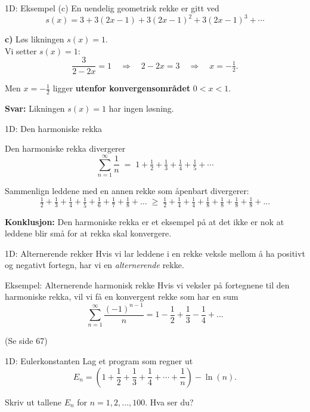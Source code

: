 \greenheader
\begin{frame}{1D: Eksempel (c)}
En uendelig geometrisk rekke er gitt ved
\[
s(x) = 3 + 3(2x-1) + 3(2x-1)^2 + 3(2x-1)^3 + \cdots
\]

\textbf{c)} Løs likningen $s(x) = 1$.\\

Vi setter $s(x) = 1$:
\[
\frac{3}{2-2x} = 1 \quad \Longrightarrow \quad 2-2x = 3 \quad \Longrightarrow \quad x = -\tfrac12.
\]

Men $x=-\tfrac12$ ligger \textbf{utenfor konvergensområdet} $0<x<1$.  

\medskip
\textbf{Svar:} Likningen $s(x)=1$ har ingen løsning.
\end{frame}

\blueheader
\begin{frame}{1D: Den harmoniske rekka}


Den harmoniske rekka divergerer
\[
\sum_{n=1}^{\infty} \frac{1}{n} \;=\; 1 + \tfrac{1}{2} + \tfrac{1}{3} + \tfrac{1}{4} + \tfrac{1}{5} + \cdots
\]

\medskip
Sammenlign leddene med en annen rekke som åpenbart divergerer:
  \[
  \tfrac{1}{2} + \tfrac{1}{3} + \tfrac{1}{4} +\tfrac{1}{5} +\tfrac{1}{6} +\tfrac{1}{7} +\tfrac{1}{8}+... \; \geq \; \tfrac{1}{2}+\tfrac{1}{4}+\tfrac{1}{4}+\tfrac{1}{8}+\tfrac{1}{8}+\tfrac{1}{8}+\tfrac{1}{8}+...
  \]

\medskip
\textbf{Konklusjon:} Den harmoniske rekka er et eksempel på at det ikke er nok at leddene blir små for at rekka skal konvergere.
\end{frame}

\blueheader
\begin{frame}{1D: Alternerende rekker}
Hvis vi lar leddene i en rekke veksle mellom å ha positivt og negativt fortegn, har vi en \emph{alternerende} rekke.

\begin{green*}{Eksempel: Alternerende harmonisk rekke}
    Hvis vi veksler på fortegnene til den harmoniske rekka, vil vi få en konvergent rekke som har en sum
    \[
    \sum_{n=1}^{\infty}\frac{(-1)^{n-1}}{n}=1-\frac{1}{2}+\frac{1}{3}-\frac{1}{4}+...
    \]

    \medskip
    (Se side 67)
\end{green*}
\end{frame}

\cyanheader
\begin{frame}[t]{1D: Eulerkonstanten}
Lag et program som regner ut
\[
E_n = \left(1 + \frac{1}{2} + \frac{1}{3} + \frac{1}{4} + \cdots + \frac{1}{n}\right) - \ln(n).
\]

\medskip
Skriv ut tallene $E_n$ for $n = 1,2,\ldots,100$. Hva ser du?

\end{frame}

